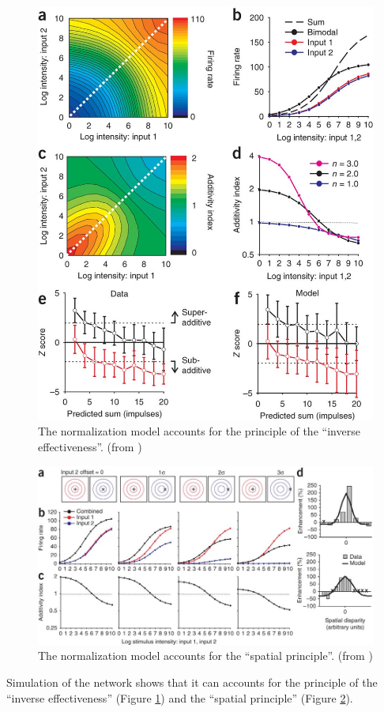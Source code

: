 \documentclass{article}[11pt]
\begin{document}
\begin{figure}[tpb]
  \centering
  \includegraphics[width=.6\textwidth]{inverse}
  \caption{The normalization model accounts for the principle of the ``inverse effectiveness''. (from \cite{ohshiro_normalization_2011})}
  \label{fig:inverse}
\end{figure}

\begin{figure}[tpb]
  \centering
  \includegraphics[width=\textwidth]{spatial}
  \caption{The normalization model accounts for the ``spatial principle''. (from \cite{ohshiro_normalization_2011})}
  \label{fig:spatial}
\end{figure}

Simulation of the network shows that it can accounts for the principle of the ``inverse effectiveness'' (Figure \ref{fig:inverse}) and the ``spatial principle'' (Figure \ref{fig:spatial}). 
\end{document}
